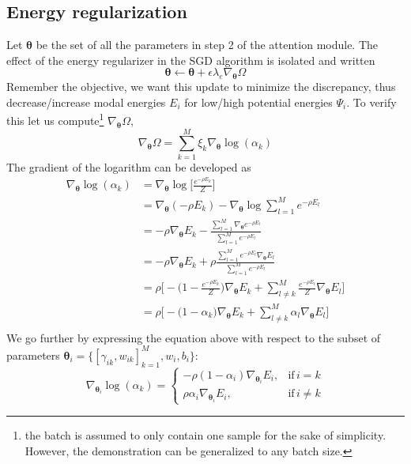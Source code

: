 \subsection*{Energy regularization}
Let $\bm{\theta}$ be the set of all the parameters in step 2 of the attention module. The effect of the energy regularizer in the SGD algorithm is isolated and written
\begin{equation}
\bm{\theta} \leftarrow \bm{\theta} + \epsilon\lambda_e\nabla_{\bm{\theta}}\Omega
\label{eq:update}
\end{equation}
Remember the objective, we want this update to minimize the discrepancy, thus decrease/increase modal energies $E_i$ for low/high potential energies $\Psi_i$. To verify this let us compute\footnote{the batch is assumed to only contain one sample for the sake of simplicity. However, the demonstration can be generalized to any batch size.} $\nabla_{\bm{\theta}}\Omega$,
\begin{equation}
\nabla_{\bm{\theta}} \Omega =\sum_{k=1}^M \xi_k \nabla_{\bm{\theta}} \log(\alpha_k) 
\label{eq:dev}
\end{equation}
The gradient of the logarithm can be developed as
\begin{equation}
\begin{split}  
\nabla_{\bm{\theta}}  \log(\alpha_k) &= \nabla_{\bm{\theta}} \log \bigg[ \frac{e^{-\rho E_k}}{Z} \bigg] \\
&=  \nabla_{\bm{\theta}}(-\rho E_k) -  \nabla_{\bm{\theta}} \log \sum_{l=1}^M e^{-\rho E_l} \\
&=  -\rho \nabla_{\bm{\theta}}E_k - \frac{\sum_{l=1}^M \nabla_{\bm{\theta}} e^{-\rho E_l}}{\sum_{l=1}^M e^{-\rho E_l}} \\
&= -\rho \nabla_{\bm{\theta}}E_k + \rho \frac{\sum_{l=1}^M e^{-\rho E_l} \nabla_{\bm{\theta}}E_l}{\sum_{l=1}^M e^{-\rho E_l}} \\
&= \rho \Bigg[ -\big(1 - \frac{e^{-\rho E_k}}{Z}\big)\nabla_{\bm{\theta}}E_k + \sum_{l \neq k}^M \frac{e^{-\rho E_l}}{Z} \nabla_{\bm{\theta}}E_l \Bigg] \\
&= \rho \Bigg[ -\big(1 - \alpha_k\big)\nabla_{\bm{\theta}}E_k + \sum_{l \neq k}^M \alpha_l \nabla_{\bm{\theta}}E_l \Bigg] \\
\end{split}
\label{eq:grad-log}
\end{equation}
We go further by expressing the equation above with respect to the subset of parameters $\bm{\theta}_i = \{[\gamma_{ik}, w_{ik}]_{k=1}^M, w_i, b_i\}$:
\begin{equation}
\nabla_{\bm{\theta}_i}  \log(\alpha_k) = \begin{cases}
      -\rho(1-\alpha_i)\nabla_{\bm{\theta}_i}E_i, & \text{if}\, i = k \\
       \rho\alpha_i\nabla_{\bm{\theta}_i}E_i, & \text{if}\, i \neq k
    \end{cases}
\label{eq:log-split}
\end{equation}

